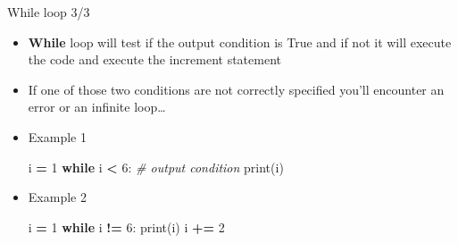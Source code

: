 \documentclass[
  8pt,
  ignorenonframetext,
]{beamer}
\newenvironment{Shaded}{\begin{snugshade}}{\end{snugshade}}
\newcommand{\BuiltInTok}[1]{#1}
\newcommand{\CommentTok}[1]{\textcolor[rgb]{0.56,0.35,0.01}{\textit{#1}}}
\newcommand{\ControlFlowTok}[1]{\textcolor[rgb]{0.13,0.29,0.53}{\textbf{#1}}}
\newcommand{\DecValTok}[1]{\textcolor[rgb]{0.00,0.00,0.81}{#1}}
\newcommand{\NormalTok}[1]{#1}
\newcommand{\OperatorTok}[1]{\textcolor[rgb]{0.81,0.36,0.00}{\textbf{#1}}}
\providecommand{\tightlist}{%
  \setlength{\itemsep}{0pt}\setlength{\parskip}{0pt}}
\begin{document}
\begin{frame}[fragile]{While loop 3/3}
\protect\hypertarget{while-loop-33}{}
\begin{itemize}[<+->]
\tightlist
\item
  \textbf{While} loop will test if the output condition is True and if
  not it will execute the code and execute the increment statement
\end{itemize}

\begin{itemize}[<+->]
\item
  If one of those two conditions are not correctly specified you'll
  encounter an error or an infinite loop\ldots{}
\item
  Example 1

\begin{Shaded}
\begin{Highlighting}[]
\NormalTok{i }\OperatorTok{=} \DecValTok{1}
\ControlFlowTok{while}\NormalTok{ i }\OperatorTok{\textless{}} \DecValTok{6}\NormalTok{: }\CommentTok{\#  output condition}
  \BuiltInTok{print}\NormalTok{(i)}
\end{Highlighting}
\end{Shaded}
\end{itemize}

\begin{itemize}[<+->]
\item
  Example 2

\begin{Shaded}
\begin{Highlighting}[]
\NormalTok{i }\OperatorTok{=} \DecValTok{1}
\ControlFlowTok{while}\NormalTok{ i }\OperatorTok{!=} \DecValTok{6}\NormalTok{:}
  \BuiltInTok{print}\NormalTok{(i)}
\NormalTok{  i }\OperatorTok{+=} \DecValTok{2}
\end{Highlighting}
\end{Shaded}
\end{itemize}
\end{frame}
\end{document}
